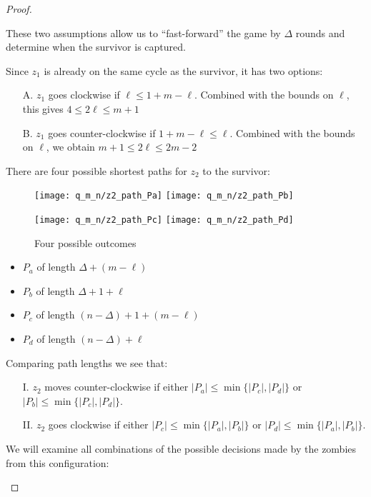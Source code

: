 \begin{proof}
\begin{description}
  These two assumptions allow us to ``fast-forward'' the game by $\Delta$ rounds
  and determine when the survivor is captured.

  Since $z_1$ is already on the same cycle as the survivor, it has two options:

  \begin{itemize}
   \item[A.] $z_1$ goes clockwise if $\ell \leq 1 + m - \ell$.
         Combined with the bounds on $\ell$, this gives $4 \leq 2 \ell \leq m + 1$

   \item[B.] $z_1$ goes counter-clockwise if $1 + m - \ell \leq \ell$.
         Combined with the bounds on $\ell$, we obtain $m + 1 \leq 2 \ell \leq 2m - 2$
  \end{itemize}

  There are four possible shortest paths for $z_2$ to the survivor:

  \begin{figure}
    \centering
    \texttt{[image: q\_m\_n/z2\_path\_Pa]}
    \texttt{[image: q\_m\_n/z2\_path\_Pb]}

    \texttt{[image: q\_m\_n/z2\_path\_Pc]}
    \texttt{[image: q\_m\_n/z2\_path\_Pd]}
    \caption{Four possible outcomes \label{fig:different_paths}}
  \end{figure}

  \begin{itemize}
   \item $P_a$ of length $\Delta + (m - \ell)$
   \item $P_b$ of length $\Delta + 1 + \ell$
   \item $P_c$ of length $(n-\Delta) + 1 + (m-\ell)$
   \item $P_d$ of length $(n-\Delta) + \ell$
  \end{itemize}

  Comparing path lengths we see that:

  \begin{itemize}
   \item[I.] $z_2$ moves counter-clockwise if either $|P_a| \leq \min \{ |P_c|, |P_d| \}$ or $|P_b| \leq \min \{ |P_c|, |P_d| \}$.

   \item[II.] $z_2$ goes clockwise if either $|P_c| \leq \min \{ |P_a|, |P_b| \}$ or $|P_d| \leq \min \{ |P_a|, |P_b| \}$.
  \end{itemize}

  We will examine all combinations of the possible decisions
  made by the zombies from this configuration:


\end{description}
\end{proof}
